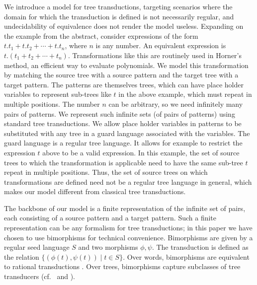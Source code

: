 \documentclass[12pt, a4paper]{article}
\newcommand{\seedLang}{S}
\begin{document}
We introduce a model for tree transductions, targeting scenarios where the domain for which the transduction is defined is not necessarily regular, and undecidability of equivalence does not render the model useless. Expanding on the example from the abstract, consider expressions of the form $t.t_{1} + t.t_{2} + \cdots + t.t_{n}$, where $n$ is any number. An
equivalent expression is $t.(t_1 + t_2 + \cdots + t_n)$. Transformations like this are routinely used in Horner's method, an efficient way to evaluate polynomials. We model this transformation by matching the source tree with a source pattern and the target tree with a target pattern. The patterns are themselves trees, which can have place holder variables to represent sub-trees like $t$ in the above example, which must repeat in multiple positions. The number $n$ can be arbitrary, so we need infinitely many pairs of patterns. We represent
such infinite sets (of pairs of patterns) using standard tree transductions. We allow place holder variables in patterns to be substituted with any tree in a guard language associated with the variables. The guard language is a regular tree language. It allows for example to restrict the expression $t$ above to be a valid expression. In this example, the set of source trees to which the transformation is applicable need to have the same sub-tree $t$ repeat in multiple positions. Thus, the set of source trees on which transformations are defined need not be a regular tree language in general, which makes our model different from classical tree transductions. 

The backbone of our model is a finite representation of the infinite set of pairs, each consisting of a source pattern and a target pattern. Such a finite representation can be any formalism for tree transductions; in this paper we have chosen to use bimorphisms for technical convenience. Bimorphisms are given by a regular seed language $\seedLang$ and two morphisms $\phi, \psi$. The transduction is defined as the relation $\{(\phi(t), \psi(t)) \mid t \in \seedLang\}$. Over words, bimorphisms are equivalent to rational transductions \cite{N1968}. Over trees, bimorphisms capture subclasses of tree transducers (cf.~\cite[Section 6.5]{tata} and \cite{E1975}).
\end{document}
